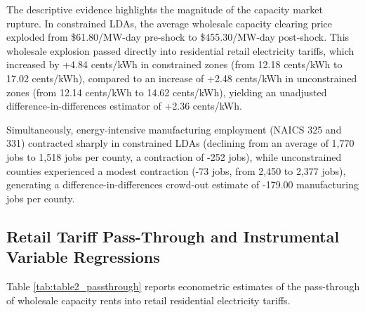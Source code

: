 \documentclass[11pt,a4paper]{article}
\begin{document}
The descriptive evidence highlights the magnitude of the capacity market rupture. In constrained LDAs, the average wholesale capacity clearing price exploded from \$61.80/MW-day pre-shock to \$455.30/MW-day post-shock. This wholesale explosion passed directly into residential retail electricity tariffs, which increased by +4.84 cents/kWh in constrained zones (from 12.18 cents/kWh to 17.02 cents/kWh), compared to an increase of +2.48 cents/kWh in unconstrained zones (from 12.14 cents/kWh to 14.62 cents/kWh), yielding an unadjusted difference-in-differences estimator of +2.36 cents/kWh.

Simultaneously, energy-intensive manufacturing employment (NAICS 325 and 331) contracted sharply in constrained LDAs (declining from an average of 1,770 jobs to 1,518 jobs per county, a contraction of -252 jobs), while unconstrained counties experienced a modest contraction (-73 jobs, from 2,450 to 2,377 jobs), generating a difference-in-differences crowd-out estimate of -179.00 manufacturing jobs per county.

\subsection{Retail Tariff Pass-Through and Instrumental Variable Regressions}

Table \ref{tab:table2_passthrough} reports econometric estimates of the pass-through of wholesale capacity rents into retail residential electricity tariffs.
\end{document}
